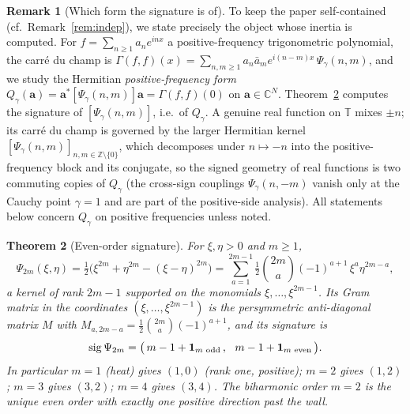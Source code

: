 \documentclass[11pt,reqno]{amsart}
\theoremstyle{plain}
\newtheorem{theorem}{Theorem}[section]
\theoremstyle{definition}
\newtheorem{remark}[theorem]{Remark}
\newcommand{\T}{\mathbb{T}}
\newcommand{\Z}{\mathbb{Z}}
\newcommand{\C}{\mathbb{C}}
\newcommand{\Gam}{\Gamma}
\DeclareMathOperator{\sig}{sig}
\begin{document}
\begin{remark}[Which form the signature is of]\label{rem:class}
To keep the paper self-contained (cf.\ Remark~\ref{rem:indep}), we state precisely
the object whose inertia is computed. For $f=\sum_{n\ge1}a_n e^{inx}$ a
positive-frequency trigonometric polynomial, the carr\'e du champ is
$\Gam(f,f)(x)=\sum_{n,m\ge1}a_n\bar a_m e^{i(n-m)x}\,\Psi_\gamma(n,m)$, and we
study the Hermitian \emph{positive-frequency form}
$Q_\gamma(\mathbf a)=\mathbf a^{*}[\Psi_\gamma(n,m)]\mathbf a=\Gam(f,f)(0)$ on
$\mathbf a\in\C^{N}$. Theorem~\ref{thm:sig} computes the signature of
$[\Psi_\gamma(n,m)]$, i.e.\ of $Q_\gamma$. A genuine real function on $\T$ mixes
$\pm n$; its carr\'e du champ is governed by the larger Hermitian kernel
$[\Psi_\gamma(n,m)]_{n,m\in\Z\setminus\{0\}}$, which decomposes under
$n\mapsto-n$ into the positive-frequency block and its conjugate, so the
signed geometry of real functions is two commuting copies of $Q_\gamma$ (the
cross-sign couplings $\Psi_\gamma(n,-m)$ vanish only at the Cauchy point $\gamma=1$
and are part of the positive-side analysis). All statements below concern
$Q_\gamma$ on positive frequencies unless noted.
\end{remark}

\begin{theorem}[Even-order signature]\label{thm:sig}
For $\xi,\eta>0$ and $m\ge1$,
\[
  \Psi_{2m}(\xi,\eta)=\tfrac12\bigl(\xi^{2m}+\eta^{2m}-(\xi-\eta)^{2m}\bigr)
  =\sum_{a=1}^{2m-1}\tfrac12\binom{2m}{a}(-1)^{a+1}\,\xi^{a}\eta^{2m-a},
\]
a kernel of rank $2m-1$ supported on the monomials $\xi,\dots,\xi^{2m-1}$. Its
Gram matrix in the coordinates $(\xi,\dots,\xi^{2m-1})$ is the persymmetric
anti-diagonal matrix $M$ with $M_{a,2m-a}=\tfrac12\binom{2m}{a}(-1)^{a+1}$, and
its signature is
\begin{equation}\label{eq:sig}
  \sig\Psi_{2m}=\bigl(\,m-1+\mathbf 1_{m\textup{ odd}}\,,\ \
  m-1+\mathbf 1_{m\textup{ even}}\,\bigr).
\end{equation}
In particular $m=1$ (heat) gives $(1,0)$ (rank one, positive); $m=2$ gives
$(1,2)$; $m=3$ gives $(3,2)$; $m=4$ gives $(3,4)$. The biharmonic order $m=2$ is
the \emph{unique} even order with exactly one positive direction past the wall.
\end{theorem}
\end{document}
